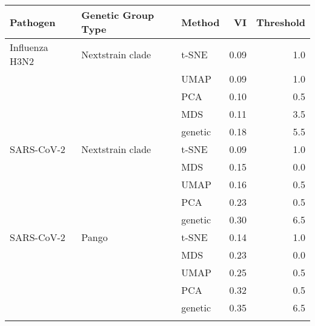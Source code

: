 \begin{tabular}{lllrr}
\toprule
      Pathogen & Genetic Group Type &  Method &   VI &  Threshold \\
\midrule
Influenza H3N2 &   Nextstrain clade &   t-SNE & 0.09 &        1.0 \\
               &                    &    UMAP & 0.09 &        1.0 \\
               &                    &     PCA & 0.10 &        0.5 \\
               &                    &     MDS & 0.11 &        3.5 \\
               &                    & genetic & 0.18 &        5.5 \\
    SARS-CoV-2 &   Nextstrain clade &   t-SNE & 0.09 &        1.0 \\
               &                    &     MDS & 0.15 &        0.0 \\
               &                    &    UMAP & 0.16 &        0.5 \\
               &                    &     PCA & 0.23 &        0.5 \\
               &                    & genetic & 0.30 &        6.5 \\
    SARS-CoV-2 &              Pango &   t-SNE & 0.14 &        1.0 \\
               &                    &     MDS & 0.23 &        0.0 \\
               &                    &    UMAP & 0.25 &        0.5 \\
               &                    &     PCA & 0.32 &        0.5 \\
               &                    & genetic & 0.35 &        6.5 \\
\botrule
\end{tabular}
